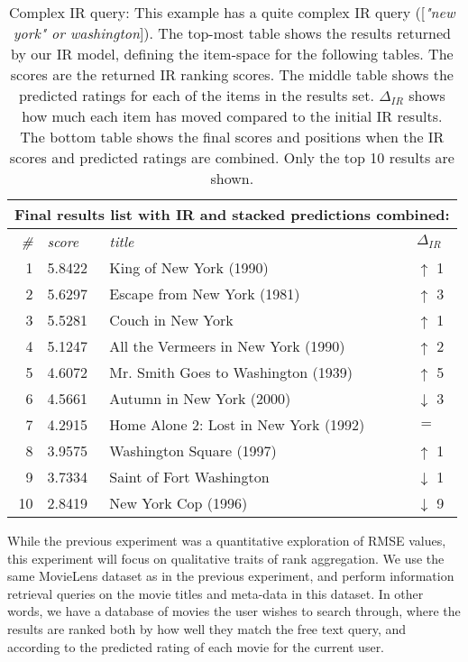\begin{table}[h]
  \begin{tabular*}{0.9\textwidth}{ r l p{8.5cm} l }
    \multicolumn{4}{l}{Final results list with IR and stacked predictions combined:}\\
    \toprule
    \emph{\#} & \emph{score} & \emph{title} & $\Delta_{IR}$ \\
    \midrule
    1 & 5.8422  &  King of New York (1990)                & \color{green} $\uparrow$ 1 \\
    2 & 5.6297  &  Escape from New York (1981)            & \color{green} $\uparrow$ 3 \\
    3 & 5.5281  &  Couch in New York                      & \color{green} $\uparrow$ 1 \\
    4 & 5.1247  &  All the Vermeers in New York (1990)    & \color{green} $\uparrow$ 2 \\
    5 & 4.6072  &  Mr. Smith Goes to Washington (1939)    & \color{green} $\uparrow$ 5 \\
    6 & 4.5661  &  Autumn in New York (2000)              & \color{red} $\downarrow$ 3 \\
    7 & 4.2915  &  Home Alone 2: Lost in New York (1992)  & \color{black} $=$ \\
    8 & 3.9575  &  Washington Square (1997)               & \color{green} $\uparrow$ 1 \\
    9 & 3.7334  &  Saint of Fort Washington               & \color{red} $\downarrow$ 1 \\
    10& 2.8419  &  New York Cop (1996)                    & \color{red} $\downarrow$ 9 \\
    \bottomrule
  \end{tabular*}

  \vspace{1em}
  \caption[Complex IR Query]{
    Complex IR query: This example has a quite complex IR query ([\emph{"new york" or washington}]).
    The top-most table shows the results returned by our IR model, defining the item-space for the following tables.
    The scores are the returned IR ranking scores.
    The middle table shows the predicted ratings for each of the items in the results set.
    $\Delta_{IR}$ shows how much each item has moved compared to the initial IR results.
    The bottom table shows the final scores and positions when the IR scores and predicted ratings are combined.
    Only the top 10 results are shown.
  }
  \label{table:rank:washington}
\end{table}

While the previous experiment was a quantitative exploration of RMSE values,
this experiment will focus on qualitative traits of rank aggregation.
We use the same MovieLens dataset as in the previous experiment,
and perform information retrieval queries on the movie titles
and meta-data in this dataset.
In other words, we have a database of movies the user wishes to search through,
where the results are ranked both by how well they match the free text query,
and according to the predicted rating of each movie for the current user.

